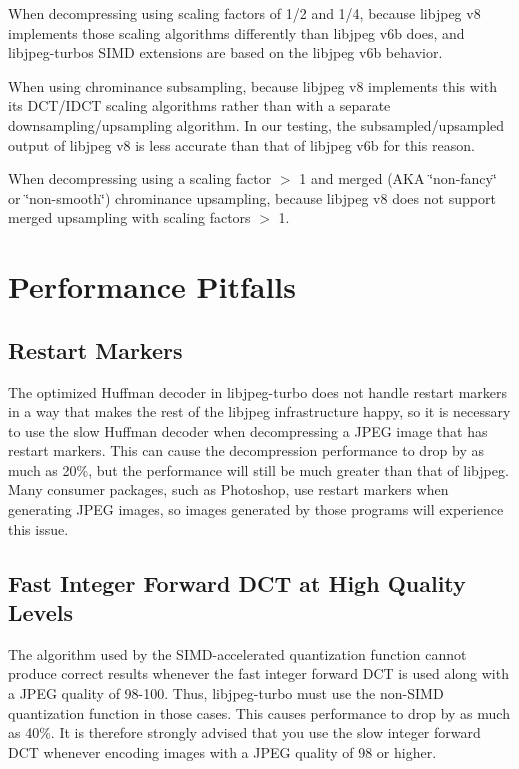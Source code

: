 \begin{DoxyItemize}
\item When decompressing using scaling factors of 1/2 and 1/4, because libjpeg v8 implements those scaling algorithms differently than libjpeg v6b does, and libjpeg-\/turbo\textquotesingle{}s S\+I\+MD extensions are based on the libjpeg v6b behavior.
\item When using chrominance subsampling, because libjpeg v8 implements this with its D\+C\+T/\+I\+D\+CT scaling algorithms rather than with a separate downsampling/upsampling algorithm. In our testing, the subsampled/upsampled output of libjpeg v8 is less accurate than that of libjpeg v6b for this reason.
\item When decompressing using a scaling factor $>$ 1 and merged (A\+KA \char`\"{}non-\/fancy\char`\"{} or \char`\"{}non-\/smooth\char`\"{}) chrominance upsampling, because libjpeg v8 does not support merged upsampling with scaling factors $>$ 1.
\end{DoxyItemize}

\section*{Performance Pitfalls }

\subsection*{Restart Markers }

The optimized Huffman decoder in libjpeg-\/turbo does not handle restart markers in a way that makes the rest of the libjpeg infrastructure happy, so it is necessary to use the slow Huffman decoder when decompressing a J\+P\+EG image that has restart markers. This can cause the decompression performance to drop by as much as 20\%, but the performance will still be much greater than that of libjpeg. Many consumer packages, such as Photoshop, use restart markers when generating J\+P\+EG images, so images generated by those programs will experience this issue.

\subsection*{Fast Integer Forward D\+CT at High Quality Levels }

The algorithm used by the S\+I\+M\+D-\/accelerated quantization function cannot produce correct results whenever the fast integer forward D\+CT is used along with a J\+P\+EG quality of 98-\/100. Thus, libjpeg-\/turbo must use the non-\/\+S\+I\+MD quantization function in those cases. This causes performance to drop by as much as 40\%. It is therefore strongly advised that you use the slow integer forward D\+CT whenever encoding images with a J\+P\+EG quality of 98 or higher.

